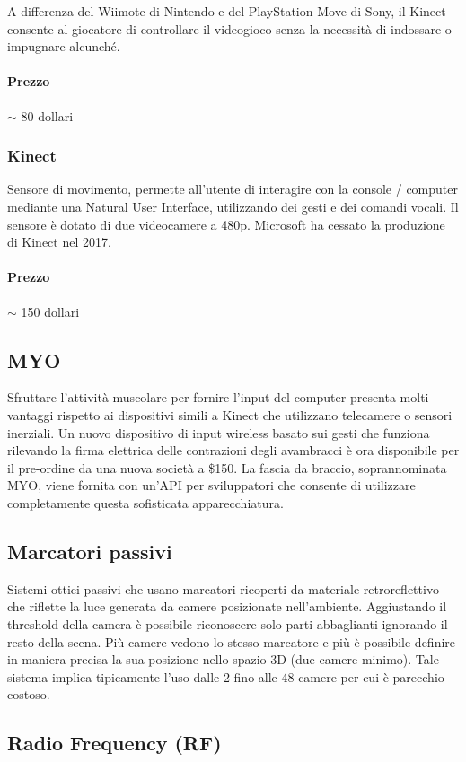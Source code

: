 \documentclass[8pt]{extarticle}
\begin{document}
\begin{multicols}{3}
A differenza del Wiimote di Nintendo e del PlayStation Move di Sony, il Kinect consente al giocatore di controllare
il videogioco senza la necessità di indossare o impugnare alcunché.

\paragraph{Prezzo} $\sim$ 80 dollari


\subsubsection{Kinect}
Sensore di movimento, permette all'utente di interagire con la console / computer mediante una Natural User Interface,
utilizzando dei gesti e dei comandi vocali.
Il sensore è dotato di due videocamere a 480p.
Microsoft ha cessato la produzione di Kinect nel 2017.

\paragraph{Prezzo} $\sim$ 150 dollari

\subsection{MYO}
Sfruttare l'attività muscolare per fornire l'input del computer presenta molti vantaggi rispetto ai dispositivi simili a Kinect che utilizzano telecamere o sensori inerziali. Un nuovo dispositivo di input wireless basato sui gesti che funziona rilevando la firma elettrica delle contrazioni degli avambracci è ora disponibile per il pre-ordine da una nuova società a \$150. La fascia da braccio, soprannominata MYO, viene fornita con un'API per sviluppatori che consente di utilizzare completamente questa sofisticata apparecchiatura.
\subsection{Marcatori passivi}
Sistemi ottici passivi che usano marcatori ricoperti da materiale retroreflettivo che riflette la luce generata da camere posizionate nell'ambiente.
Aggiustando il threshold della camera è possibile riconoscere solo parti abbaglianti ignorando il resto della scena.
Più camere vedono lo stesso marcatore e più è possibile definire in maniera precisa la sua posizione nello spazio 3D (due camere minimo).
Tale sistema implica tipicamente l'uso dalle 2 fino alle 48 camere per cui è parecchio costoso.
\subsection{Radio Frequency (RF)}

\end{multicols}
\end{document}
